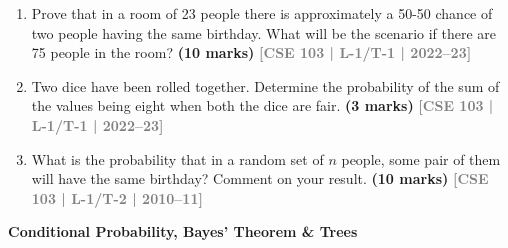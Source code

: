 \documentclass[12pt,a3paper]{article}
\newcommand{\yr}[1]{\hfill\textcolor{gray}{\small\textbf{[#1]}}}
\newcommand{\mk}[1]{\textcolor{orange!70!black}{\small\textbf{(#1 marks)}}}
\newcommand{\subtopic}[2]{%
  \vspace{10pt}
  \noindent\begin{tcolorbox}[colback=#1!8,colframe=#1,boxrule=0.6pt,arc=4pt,
    left=6pt,right=6pt,top=4pt,bottom=4pt]
    \small\bfseries\textcolor{#1}{#2}
  \end{tcolorbox}
  \vspace{2pt}
}
\begin{document}
\begin{enumerate}

\item Prove that in a room of 23 people there is approximately a 50-50 chance of two people having the same birthday. What will be the scenario if there are 75 people in the room?
\mk{10} \yr{CSE 103 | L-1/T-1 | 2022--23}

\item Two dice have been rolled together. Determine the probability of the sum of the values being eight when both the dice are fair.
\mk{3} \yr{CSE 103 | L-1/T-1 | 2022--23}

\item What is the probability that in a random set of $n$ people, some pair of them will have the same birthday? Comment on your result.
\mk{10} \yr{CSE 103 | L-1/T-2 | 2010--11}

\end{enumerate}


\subtopic{cD}{Conditional Probability, Bayes' Theorem \& Trees}
\label{sub:s8-conditional}
\end{document}
